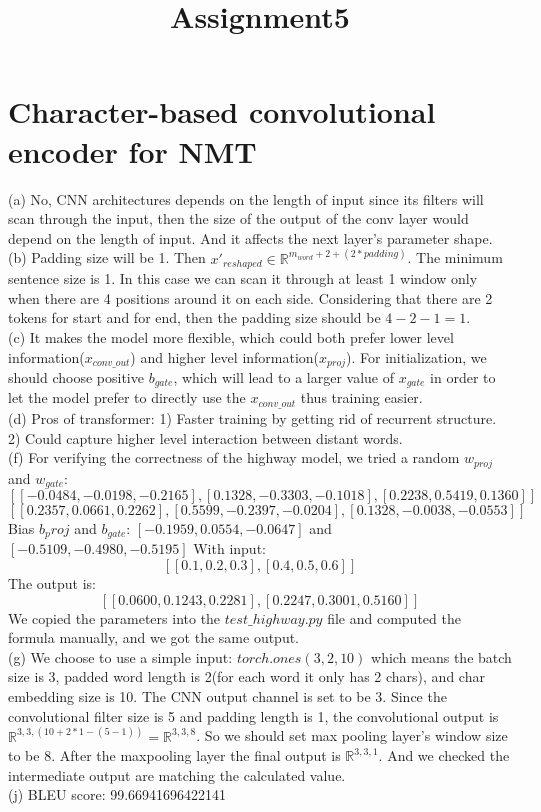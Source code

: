 \documentclass[11pt]{article}
\title{Assignment5}
\begin{document}
\maketitle
\section{Character-based convolutional encoder for NMT}
(a) No, CNN architectures depends on the length of input since its filters will scan through the input, then the size of the output of the conv layer would depend on the length of input. And it affects the next layer's parameter shape.\\
(b) Padding size will be 1. Then $x'_{reshaped}\in \mathbb R^{m_{word}+2 + (2*padding)}$. The minimum sentence size is 1. In this case we can scan it through at least 1 window only when there are 4 positions around it on each side. Considering that there are 2 tokens for start and for end, then the padding size should be $4-2-1 = 1$.\\
(c) It makes the model more flexible, which could both prefer lower level information($x_{conv\_out}$) and higher level information($x_{proj}$). For initialization, we should choose positive $b_{gate}$, which will lead to a larger value of $x_{gate}$ in order to let the model prefer to directly use the $x_{conv\_out}$ thus training easier.\\
(d) Pros of transformer: 1) Faster training by getting rid of recurrent structure. 2) Could capture higher level interaction between distant words.\\
(f) For verifying the correctness of the highway model, we tried a random $w_{proj}$ and $w_{gate}$:
$$[[-0.0484, -0.0198, -0.2165],
[ 0.1328, -0.3303, -0.1018],
[ 0.2238,  0.5419,  0.1360]]$$
$$[[ 0.2357,  0.0661,  0.2262],
[ 0.5599, -0.2397, -0.0204],
[ 0.1328, -0.0038, -0.0553]]$$
Bias $b_proj$ and $b_{gate}$:
$[-0.1959,  0.0554, -0.0647]$ and $[-0.5109, -0.4980, -0.5195]$
With input: $$[[0.1, 0.2, 0.3], [0.4, 0.5, 0.6]]$$
The output is: $$[[0.0600, 0.1243, 0.2281], [0.2247, 0.3001, 0.5160]]$$
We copied the parameters into the $test\_highway.py$ file and computed the formula manually, and we got the same output.\\
(g) We choose to use a simple input: $torch.ones(3, 2, 10)$ which means the batch size is 3, padded word length is 2(for each word it only has 2 chars), and char embedding size is 10. The CNN output channel is set to be 3. Since the convolutional filter size is 5 and padding length is 1, the convolutional output is $\mathbb{R}^{3,3, (10+2*1-(5-1))} = \mathbb{R}^{3,3,8}$. So we should set max pooling layer's window size to be 8. After the maxpooling layer the final output is $\mathbb{R}^{3,3,1}$. And we checked the intermediate output are matching the calculated value.\\
(j) BLEU score: 99.66941696422141
\end{document}
